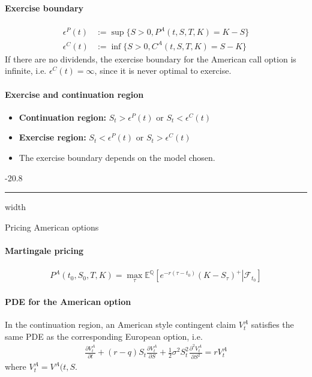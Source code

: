 \documentclass[a4paper,landscape,7pt,fleqn]{scrartcl}
\makeatletter
\renewcommand{\emph}[1]{\textbf{#1}}
\renewcommand{\subsubsection}{\@startsection{subsubsection}{1}{0mm}%
{-2\baselineskip}{0.8\baselineskip}%
{\hrule depth 0.2pt width\columnwidth\vspace*{1.2em}\normalsize\bfseries}}
\makeatother
\begin{document}
\begin{multicols*}{3}
\paragraph{Exercise boundary}
\begin{align*}
\epsilon^P(t) &:= \sup \{ S > 0, P^A(t,S,T,K) = K-S \} \\
\epsilon^C(t) &:= \inf \{ S > 0, C^A(t,S,T,K) = S-K \}
\end{align*}
If there are no dividends, the exercise boundary for the American call option is infinite, i.e. $\epsilon^C(t) = \infty$, since it is never optimal to exercise.

\paragraph{Exercise and continuation region}
\begin{itemize}
\item \emph{Continuation region:} $S_t > \epsilon^P(t)$ or $S_t < \epsilon^C(t)$
\item \emph{Exercise region:} $S_t < \epsilon^P(t)$ or $S_t > \epsilon^C(t)$
\item The exercise boundary depends on the model chosen.
\end{itemize}

\subsubsection{Pricing American options}

\paragraph{Martingale pricing}
\begin{align*}
P^A(t_0,S_0,T,K) = \max\limits_\tau \mathbb{E}^\mathbb{Q} \left[ \left. e^{-r(\tau-t_0)} (K-S_\tau)^+ \right| \mathcal{F}_{t_0} \right]
\end{align*}

\paragraph{PDE for the American option}
In the continuation region, an American style contingent claim $V_t^A$ satisfies the same PDE as the corresponding European option, i.e.
\begin{align*}
\frac{\partial V_t^A}{\partial t} + (r-q) S_t \frac{\partial V_t^A}{\partial S} + \frac{1}{2} \sigma^2 S_t^2 \frac{\partial^2 V_t^A}{\partial S^2} = r V_t^A
\end{align*}
where $V_t^A = V^A(t,S$.


\end{multicols*}
\end{document}
